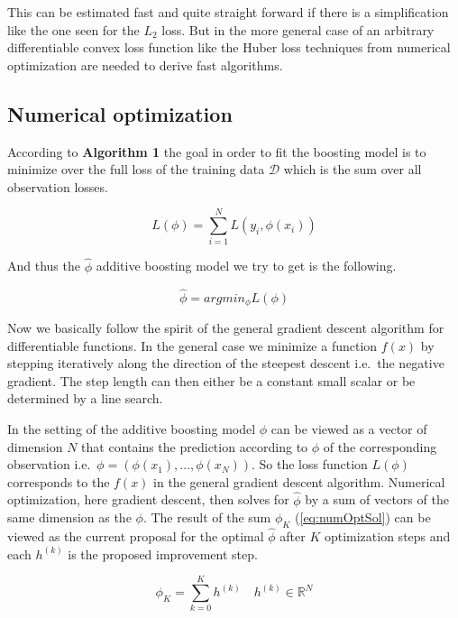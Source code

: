 \documentclass[
]{book}
\begin{document}
This can be estimated fast and quite straight forward if there is a simplification like the one seen for the \(L_2\) loss. But in the more general case of an arbitrary differentiable convex loss function like the Huber loss techniques from numerical optimization are needed to derive fast algorithms.\citep{elements}

\hypertarget{numOpt}{%
\subsection{Numerical optimization}\label{numOpt}}

According to \textbf{Algorithm 1} the goal in order to fit the boosting model is to minimize over the full loss of the training data \(\mathcal{D}\) which is the sum over all observation losses.

\[
L(\phi) = \sum_{i=1}^N L(y_i, \phi(x_i))
\]

And thus the \(\hat{\phi}\) additive boosting model we try to get is the following.

\[
\hat{\phi} = argmin_{\phi} L(\phi)
\]

Now we basically follow the spirit of the general gradient descent algorithm for differentiable functions. In the general case we minimize a function \(f(x)\) by stepping iteratively along the direction of the steepest descent i.e.~the negative gradient. The step length can then either be a constant small scalar or be determined by a line search.

In the setting of the additive boosting model \(\phi\) can be viewed as a vector of dimension \(N\) that contains the prediction according to \(\phi\) of the corresponding observation i.e.~\(\phi = (\phi(x_1),...,\phi(x_N))\). So the loss function \(L(\phi)\) corresponds to the \(f(x)\) in the general gradient descent algorithm. Numerical optimization, here gradient descent, then solves for \(\hat{\phi}\) by a sum of vectors of the same dimension as the \(\phi\).\citep{elements} The result of the sum \(\phi_K\) (\eqref{eq:numOptSol}) can be viewed as the current proposal for the optimal \(\hat{\phi}\) after \(K\) optimization steps and each \(h^{(k)}\) is the proposed improvement step.

\begin{equation}
  \phi_K = \sum_{k=0}^K h^{(k)} \quad h^{(k)} \in \mathbb{R}^N 
  \label{eq:numOptSol}
\end{equation}
\end{document}
